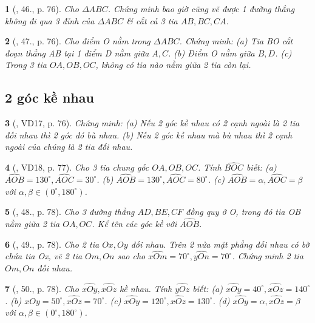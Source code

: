 \documentclass{article}
\newtheorem{baitoan}{}
\begin{document}
\begin{baitoan}[\cite{Binh_Toan_6_tap_2}, 46., p. 76]
	Cho $\Delta ABC$. Chứng minh bao giờ cũng vẽ được 1 đường thẳng không đi qua 3 đỉnh của $\Delta ABC$ \& cắt cả 3 tia $AB,BC,CA$.
\end{baitoan}

\begin{baitoan}[\cite{Binh_Toan_6_tap_2}, 47., p. 76]
	Cho điểm O nằm trong $\Delta ABC$. Chứng minh: (a) Tia BO cắt đoạn thẳng AB tại 1 điểm D nằm giữa $A,C$. (b) Điểm O nằm giữa $B,D$. (c) Trong 3 tia $OA,OB,OC$, không có tia nào nằm giữa 2 tia còn lại.
\end{baitoan}


\subsection{2 góc kề nhau}

\begin{baitoan}[\cite{Binh_Toan_6_tap_2}, VD17, p. 76]
	Chứng minh: (a) Nếu 2 góc kề nhau có 2 cạnh ngoài là 2 tia đối nhau thì 2 góc đó bù nhau. (b) Nếu 2 góc kề nhau mà bù nhau thì 2 cạnh ngoài của chúng là 2 tia đối nhau.
\end{baitoan}

\begin{baitoan}[\cite{Binh_Toan_6_tap_2}, VD18, p. 77]
	Cho 3 tia chung gốc $OA,OB,OC$. Tính $\widehat{BOC}$ biết: (a) $\widehat{AOB} = 130^\circ,\widehat{AOC} = 30^\circ$. (b) $\widehat{AOB} = 130^\circ,\widehat{AOC} = 80^\circ$. (c) $\widehat{AOB} = \alpha,\widehat{AOC} = \beta$ với $\alpha,\beta\in(0^\circ,180^\circ)$.
\end{baitoan}

\begin{baitoan}[\cite{Binh_Toan_6_tap_2}, 48., p. 78]
	Cho 3 đường thẳng $AD,BE,CF$ đồng quy ở O, trong đó tia OB nằm giữa 2 tia $OA,OC$. Kể tên các góc kề với $\widehat{AOB}$.
\end{baitoan}

\begin{baitoan}[\cite{Binh_Toan_6_tap_2}, 49., p. 78]
	Cho 2 tia $Ox,Oy$ đối nhau. Trên 2 nửa mặt phẳng đối nhau có bờ chứa tia Ox, vẽ 2 tia $Om,On$ sao cho $\widehat{xOm} = 70^\circ,\widehat{yOn} = 70^\circ$. Chứng minh 2 tia $Om,On$ đối nhau.
\end{baitoan}

\begin{baitoan}[\cite{Binh_Toan_6_tap_2}, 50., p. 78]
	Cho $\widehat{xOy},\widehat{xOz}$ kề nhau. Tính $\widehat{yOz}$ biết: (a) $\widehat{xOy} = 40^\circ,\widehat{xOz} = 140^\circ$. (b) $\widehat{xOy} = 50^\circ,\widehat{xOz} = 70^\circ$. (c) $\widehat{xOy} = 120^\circ,\widehat{xOz} = 130^\circ$. (d) $\widehat{xOy} = \alpha,\widehat{xOz} = \beta$ với $\alpha,\beta\in(0^\circ,180^\circ)$.
\end{baitoan}
\end{document}
